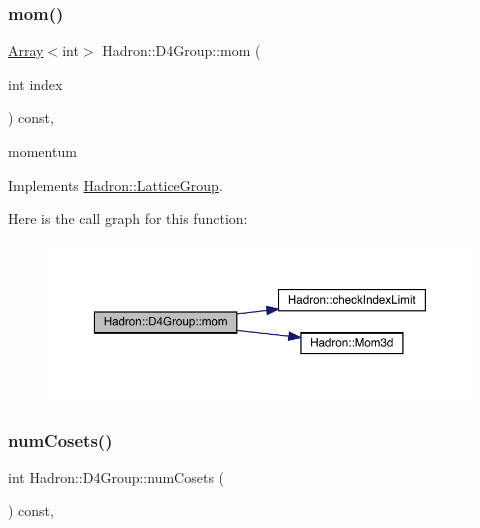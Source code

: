 \subsubsection{\texorpdfstring{mom()}{mom()}\hspace{0.1cm}{\footnotesize\ttfamily [2/2]}}
{\footnotesize\ttfamily \mbox{\hyperlink{classXMLArray_1_1Array}{Array}}$<$int$>$ Hadron\+::\+D4\+Group\+::mom (\begin{DoxyParamCaption}\item[{int}]{index }\end{DoxyParamCaption}) const\hspace{0.3cm}{\ttfamily [inline]}, {\ttfamily [virtual]}}

momentum 

Implements \mbox{\hyperlink{structHadron_1_1LatticeGroup_ad577b65041dd9a6e84b1f3bd49cb8fce}{Hadron\+::\+Lattice\+Group}}.

Here is the call graph for this function\+:
\nopagebreak
\begin{figure}[H]
\begin{center}
\leavevmode
\includegraphics[width=350pt]{de/d5e/structHadron_1_1D4Group_aeb999dc93b1a1a99ed4ffd53977a163b_cgraph}
\end{center}
\end{figure}
\mbox{\label{structHadron_1_1D4Group_a97eed87299880400afc5e9bb1ee222bc}} 
\subsubsection{\texorpdfstring{numCosets()}{numCosets()}\hspace{0.1cm}{\footnotesize\ttfamily [1/2]}}
{\footnotesize\ttfamily int Hadron\+::\+D4\+Group\+::num\+Cosets (\begin{DoxyParamCaption}{ }\end{DoxyParamCaption}) const\hspace{0.3cm}{\ttfamily [inline]}, {\ttfamily [virtual]}}

